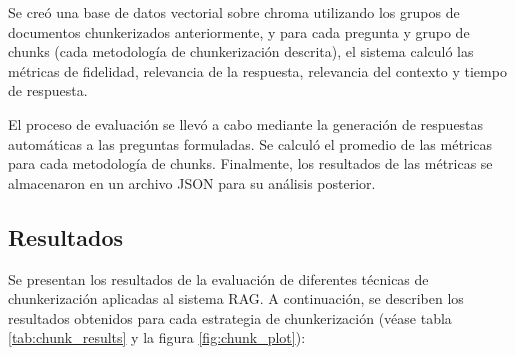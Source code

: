 Se creó una base de datos vectorial sobre chroma utilizando los grupos de documentos chunkerizados anteriormente, y para cada pregunta y grupo de chunks (cada metodología de chunkerización descrita), el sistema calculó las métricas de fidelidad, relevancia de la respuesta, relevancia del contexto y tiempo de respuesta.

El proceso de evaluación se llevó a cabo mediante la generación de respuestas automáticas a las preguntas formuladas. Se calculó el promedio de las métricas para cada metodología de chunks. Finalmente, los resultados de las métricas se almacenaron en un archivo JSON para su análisis posterior.

\subsection{Resultados}

Se presentan los resultados de la evaluación de diferentes técnicas de chunkerización aplicadas al sistema RAG. A continuación, se describen los resultados obtenidos para cada estrategia de chunkerización (véase tabla \ref{tab:chunk_results} y la figura \ref{fig:chunk_plot}):


